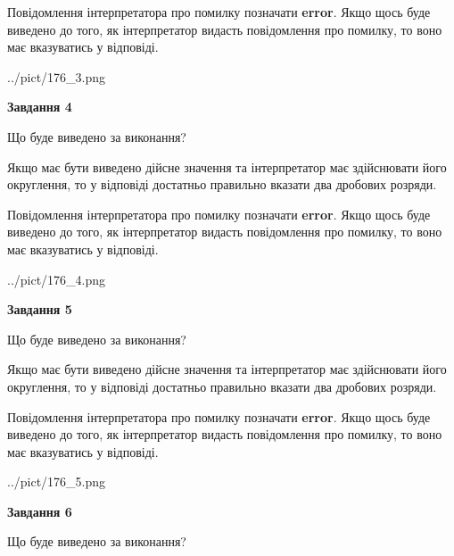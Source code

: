 \documentclass[12pt, ukrainian]{article}
\begin{document}
{\begin {Large}
Повідомлення інтерпретатора про помилку позначати \textbf{error}.
Якщо щось буде виведено до того, як інтерпретатор видасть повідомлення про помилку, 
то воно має вказуватись у відповіді. \par

\begin{center}
	{../pict/176_3.png}
\end{center}
\newpage

{\begin {center}\textbf{Завдання 4}\end {center}}\par
Що буде виведено за виконання? \par

Якщо має бути виведено дійсне значення та інтерпретатор має здійснювати його округлення, 
то у відповіді достатньо правильно вказати два дробових розряди.

Повідомлення інтерпретатора про помилку позначати \textbf{error}.
Якщо щось буде виведено до того, як інтерпретатор видасть повідомлення про помилку, 
то воно має вказуватись у відповіді. \par

\begin{center}
	{../pict/176_4.png}
\end{center}
\newpage

{\begin {center}\textbf{Завдання 5}\end {center}}\par
Що буде виведено за виконання? \par

Якщо має бути виведено дійсне значення та інтерпретатор має здійснювати його округлення, 
то у відповіді достатньо правильно вказати два дробових розряди.

Повідомлення інтерпретатора про помилку позначати \textbf{error}.
Якщо щось буде виведено до того, як інтерпретатор видасть повідомлення про помилку, 
то воно має вказуватись у відповіді. \par

\begin{center}
	{../pict/176_5.png}
\end{center}
\newpage

{\begin {center}\textbf{Завдання 6}\end {center}}\par
Що буде виведено за виконання? \par


\end{Large}}
\end{document}
